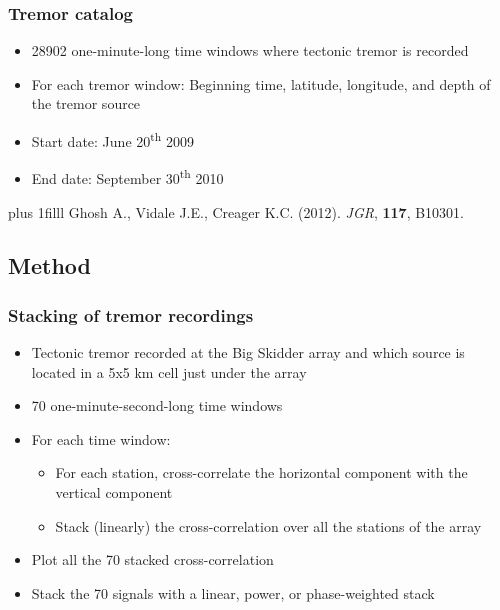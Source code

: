 \documentclass{beamer}
\newcommand{\btVFill}{\vskip0pt plus 1filll}
\begin{document}
	\begin{frame}
		\frametitle{Tremor catalog}
		\begin{itemize}
			\vspace{1em}

			\item 28902 one-minute-long time windows where tectonic tremor is recorded

			\vspace{1em}

			\item For each tremor window: Beginning time, latitude, longitude, and depth of the tremor source

			\vspace{1em}

			\item Start date: June 20\textsuperscript{th} 2009

			\vspace{1em}

			\item End date: September 30\textsuperscript{th} 2010
		\end{itemize}
		\btVFill
		\tiny{Ghosh A., Vidale J.E., Creager K.C. (2012). \textit{JGR}, \textbf{117}, B10301.}
	\end{frame}

	\subsection{Method}

	\begin{frame}
		\frametitle{Stacking of tremor recordings}
		\begin{itemize}
			\item Tectonic tremor recorded at the Big Skidder array and which source is located in a 5x5 km cell just under the array
			\item 70 one-minute-second-long time windows
			\item For each time window:
			\begin{itemize}
				\item For each station, cross-correlate the horizontal component with the vertical component
				\item Stack (linearly) the cross-correlation over all the stations of the array
			\end{itemize}
			\item Plot all the 70 stacked cross-correlation
			\item Stack the 70 signals with a linear, power, or phase-weighted stack
		\end{itemize}
	\end{frame}
\end{document}
